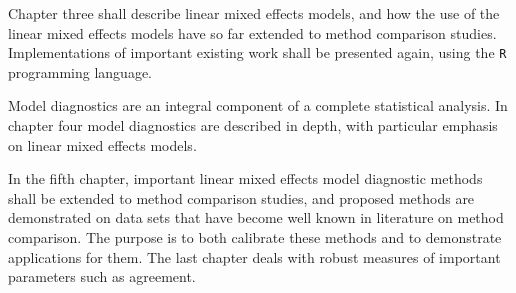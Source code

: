 \documentclass[12pt, a4paper]{report}
\theoremstyle{plain}
\theoremstyle{definition}
\theoremstyle{remark}
\begin{document}
		
	Chapter three shall describe linear mixed effects models, and how the use of the linear mixed effects models have so far extended to method comparison studies. Implementations of important existing work shall be presented again, using the \texttt{R} programming language.
	
	Model diagnostics are an integral component of a complete statistical analysis.
	In chapter four model diagnostics are described in depth, with particular
	emphasis on linear mixed effects models.
	
	In the fifth chapter, important linear mixed effects model diagnostic methods shall be extended to method comparison studies, and proposed methods are demonstrated on data sets that have become well known in literature on method comparison. The purpose is to both calibrate these methods and to demonstrate applications for them.
	The last chapter deals with robust measures of important parameters such as agreement.
	
	
	
\end{document}
